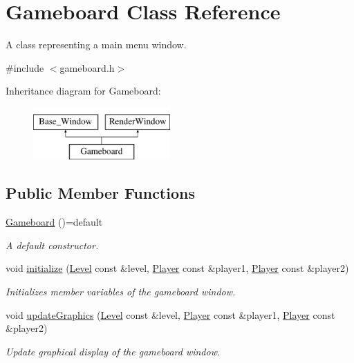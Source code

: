 \hypertarget{classGameboard}{}\section{Gameboard Class Reference}
\label{classGameboard}


A class representing a main menu window.  




{\ttfamily \#include $<$gameboard.\+h$>$}

Inheritance diagram for Gameboard\+:\begin{figure}[H]
\begin{center}
\leavevmode
\includegraphics[height=2.000000cm]{classGameboard}
\end{center}
\end{figure}
\subsection*{Public Member Functions}
\begin{DoxyCompactItemize}
\item 
\hyperlink{classGameboard_a35e7c6d4e378d0e62a5cd964933410cf}{Gameboard} ()=default
\begin{DoxyCompactList}\small\item\em A default constructor. \end{DoxyCompactList}\item 
void \hyperlink{classGameboard_a26dc97929c4382659d1f52bb0f8bb19a}{initialize} (\hyperlink{classLevel}{Level} const \&level, \hyperlink{classPlayer}{Player} const \&player1, \hyperlink{classPlayer}{Player} const \&player2)
\begin{DoxyCompactList}\small\item\em Initializes member variables of the gameboard window. \end{DoxyCompactList}\item 
void \hyperlink{classGameboard_a6192fda60355f9bb0175af2fc50f40d0}{update\+Graphics} (\hyperlink{classLevel}{Level} const \&level, \hyperlink{classPlayer}{Player} const \&player1, \hyperlink{classPlayer}{Player} const \&player2)
\begin{DoxyCompactList}\small\item\em Update graphical display of the gameboard window. \end{DoxyCompactList}\end{DoxyCompactItemize}
